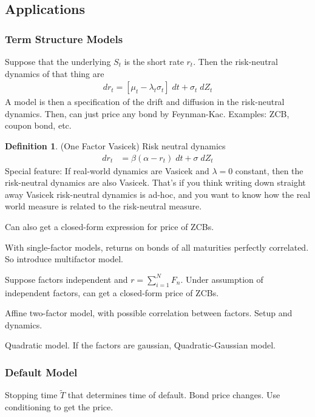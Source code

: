 \documentclass[12pt]{article}
\theoremstyle{plain}
\theoremstyle{definition}
\newtheorem{defn}[thm]{Definition}
\theoremstyle{remark}
\newcommand{\sumiN}{\sum^N_{i=1}}
\begin{document}
\clearpage
\subsection{Applications}

\subsubsection{Term Structure Models}

Suppose that the underlying $S_t$ is the short rate $r_t$.
Then the risk-neutral dynamics of that thing are
\begin{align*}
  dr_t
  =
  [\mu_t-\lambda_t\sigma_t]\;dt
  + \sigma_t \;dZ_t
\end{align*}
A model is then a specification of the drift and diffusion in the
risk-neutral dynamics. Then, can just price any bond by Feynman-Kac.
Examples: ZCB, coupon bond, etc.

\begin{defn}(One Factor Vasicek)
Risk neutral dynamics
\begin{align*}
  dr_t
  &=
  \beta(\alpha-r_t)\;dt
  +
  \sigma\;dZ_t
\end{align*}
Special feature: If real-world dynamics are Vasicek and $\lambda=0$
constant, then the risk-neutral dynamics are also Vasicek. That's if you
think writing down straight away Vasicek risk-neutral dynamics is
ad-hoc, and you want to know how the real world measure is related to
the risk-neutral measure.

Can also get a closed-form expression for price of ZCBs.
\end{defn}

With single-factor models, returns on bonds of all maturities perfectly
correlated.
So introduce multifactor model.

Suppose factors independent and $r=\sumiN F_n$. Under assumption of
independent factors, can get a closed-form price of ZCBs.

Affine two-factor model, with possible correlation between factors.
Setup and dynamics.

Quadratic model. If the factors are gaussian, Quadratic-Gaussian model.


\subsubsection{Default Model}

Stopping time $\tilde{T}$ that determines time of default.
Bond price changes. Use conditioning to get the price.
\end{document}
